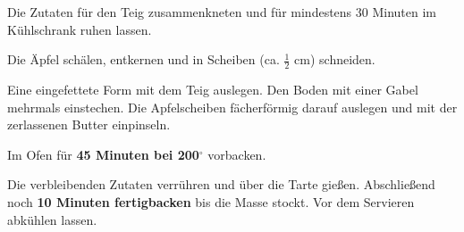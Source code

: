 \vspace*{\fill}
\begin{multicols}{2}

Die Zutaten für den Teig zusammenkneten und für mindestens 30 Minuten im Kühlschrank
ruhen lassen.\newline

Die Äpfel schälen, entkernen und in Scheiben (ca. $\frac{1}{2}$ cm) schneiden.\newline

Eine eingefettete Form mit dem Teig auslegen. Den Boden mit einer Gabel mehrmals einstechen.
Die Apfelscheiben fächerförmig darauf auslegen und mit der zerlassenen Butter einpinseln.\newline

Im Ofen für  \textbf{45 Minuten bei 200$^\circ$} vorbacken.\newline

Die verbleibenden Zutaten verrühren und über die Tarte gießen. Abschließend noch \textbf{10 Minuten
fertigbacken} bis die Masse stockt.\newline
Vor dem Servieren abkühlen lassen.






\end{multicols}
\vfill
